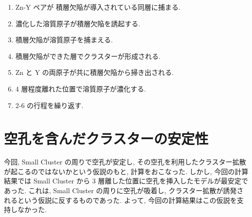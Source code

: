 \begin{enumerate}
 \item Zn-Y ペアが 積層欠陥が導入されている同層に捕まる.
 \item 濃化した溶質原子が積層欠陥を誘起する.
 \item 積層欠陥が溶質原子を捕まえる.
 \item 積層欠陥ができた層でクラスターが形成される.
 \item Zn と Y の両原子が共に積層欠陥から掃き出される.
 \item 4 層程度離れた位置で溶質原子が濃化する.
 \item 2-6 の行程を繰り返す.
\end{enumerate}


\section{空孔を含んだクラスターの安定性}
今回, Small Cluster の周りで空孔が安定し, その空孔を利用したクラスター拡散が起こるのではないかという仮説のもと, 計算をおこなった. しかし, 今回の計算結果では Small Cluster から 3 層離した位置に空孔を挿入したモデルが最安定であった. これは, Small Cluster の周りに空孔が吸着し, クラスター拡散が誘発されるという仮説に反するものであった. よって, 今回の計算結果はこの仮説を支持しなかった.




